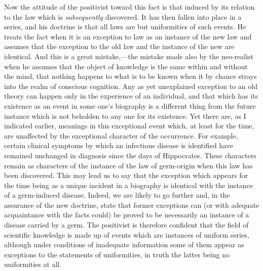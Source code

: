 \documentclass[12pt]{article}
\begin{document}
Now the attitude of the positivist toward this fact
is that induced by its relation to the law which is \emph{subsequently}
discovered. It has then fallen into place in
a series, and his doctrine is that all laws are but uniformities
of such events. He treats the fact when it
is an exception to law as an instance of the new law
and assumes that the exception to the old law and
the instance of the new are identical. And this
is a great mistake,—the mistake made also by the neo-realist
when he assumes that the object of knowledge
is the same within and without the mind, that nothing
happens to what is to be known when it by chance
strays into the realm of conscious cognition. Any as
yet unexplained exception to an old theory can happen
only in the experience of an individual, and that which
has its existence as an event in some one's biography
is a different thing from the future instance which is
not beholden to any one for its existence. Yet there
are, as I indicated earlier, meanings in this exceptional
event which, at least for the time, are unaffected by
the exceptional character of the occurrence. For example,
certain clinical symptoms by which an infectious
disease is identified have remained unchanged in diagnosis
since the days of Hippocrates. These characters
remain as characters of the instance of the law of germ-origin
when this law has been discovered. This may
lead us to say that the exception which appears for
the time being as a unique incident in a biography
is identical with the instance of a germ-induced disease.
Indeed, we are likely to go further and, in the assurance
of the new doctrine, state that former exceptions can
(or with adequate acquaintance with the facts could)
be proved to be necessarily an instance of a disease
carried by a germ. The positivist is therefore confident
that the field of scientific knowledge is made up
of events which are instances of uniform series, although
under conditions of inadequate information
some of them appear as exceptions to the statements
of uniformities, in truth the latter being no uniformities
at all.
\end{document}

